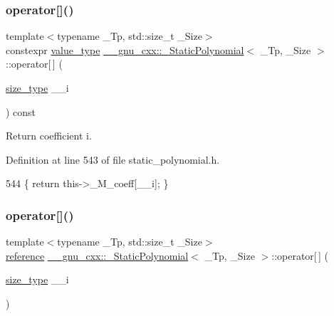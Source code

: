 \subsubsection{\texorpdfstring{operator[]()}{operator[]()}\hspace{0.1cm}{\footnotesize\ttfamily [1/2]}}
{\footnotesize\ttfamily template$<$typename \+\_\+\+Tp, std\+::size\+\_\+t \+\_\+\+Size$>$ \\
constexpr \hyperlink{class____gnu__cxx_1_1__StaticPolynomial_aad5f3d6d5876b6926b30724aeac649d6}{value\+\_\+type} \hyperlink{class____gnu__cxx_1_1__StaticPolynomial}{\+\_\+\+\_\+gnu\+\_\+cxx\+::\+\_\+\+Static\+Polynomial}$<$ \+\_\+\+Tp, \+\_\+\+Size $>$\+::operator\mbox{[}$\,$\mbox{]} (\begin{DoxyParamCaption}\item[{\hyperlink{class____gnu__cxx_1_1__StaticPolynomial_a0cc0aa4adab35686ef2474e07f511ff9}{size\+\_\+type}}]{\+\_\+\+\_\+i }\end{DoxyParamCaption}) const\hspace{0.3cm}{\ttfamily [inline]}}

Return coefficient {\ttfamily i}. 

Definition at line 543 of file static\+\_\+polynomial.\+h.


\begin{DoxyCode}
544       \{ \textcolor{keywordflow}{return} this->\_M\_coeff[\_\_i]; \}
\end{DoxyCode}
\mbox{\label{class____gnu__cxx_1_1__StaticPolynomial_ae898e5bc7bfb0e2c3a2e55ab873e80a7}} 
\subsubsection{\texorpdfstring{operator[]()}{operator[]()}\hspace{0.1cm}{\footnotesize\ttfamily [2/2]}}
{\footnotesize\ttfamily template$<$typename \+\_\+\+Tp, std\+::size\+\_\+t \+\_\+\+Size$>$ \\
\hyperlink{class____gnu__cxx_1_1__StaticPolynomial_a2416b66d254edf3e7118a8fb1204403f}{reference} \hyperlink{class____gnu__cxx_1_1__StaticPolynomial}{\+\_\+\+\_\+gnu\+\_\+cxx\+::\+\_\+\+Static\+Polynomial}$<$ \+\_\+\+Tp, \+\_\+\+Size $>$\+::operator\mbox{[}$\,$\mbox{]} (\begin{DoxyParamCaption}\item[{\hyperlink{class____gnu__cxx_1_1__StaticPolynomial_a0cc0aa4adab35686ef2474e07f511ff9}{size\+\_\+type}}]{\+\_\+\+\_\+i }\end{DoxyParamCaption})\hspace{0.3cm}{\ttfamily [inline]}}

